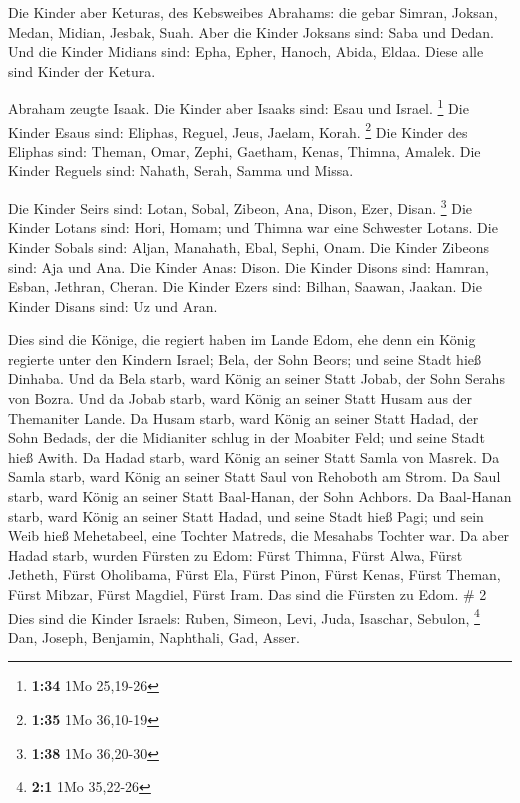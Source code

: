  Die Kinder aber Keturas, des Kebsweibes Abrahams: die
gebar Simran, Joksan, Medan, Midian, Jesbak, Suah. Aber die Kinder
Joksans sind: Saba und Dedan.  Und die Kinder Midians sind:
Epha, Epher, Hanoch, Abida, Eldaa. Diese alle sind Kinder der Ketura.

 Abraham zeugte Isaak. Die Kinder aber Isaaks sind: Esau
und Israel. \footnote{\textbf{1:34} 1Mo 25,19-26}  Die
Kinder Esaus sind: Eliphas, Reguel, Jeus, Jaelam, Korah. \footnote{\textbf{1:35}
  1Mo 36,10-19}  Die Kinder des Eliphas sind: Theman, Omar,
Zephi, Gaetham, Kenas, Thimna, Amalek.  Die Kinder Reguels
sind: Nahath, Serah, Samma und Missa.

 Die Kinder Seirs sind: Lotan, Sobal, Zibeon, Ana, Dison,
Ezer, Disan. \footnote{\textbf{1:38} 1Mo 36,20-30}  Die
Kinder Lotans sind: Hori, Homam; und Thimna war eine Schwester Lotans.
 Die Kinder Sobals sind: Aljan, Manahath, Ebal, Sephi,
Onam. Die Kinder Zibeons sind: Aja und Ana.  Die Kinder
Anas: Dison. Die Kinder Disons sind: Hamran, Esban, Jethran, Cheran.
 Die Kinder Ezers sind: Bilhan, Saawan, Jaakan. Die Kinder
Disans sind: Uz und Aran.

 Dies sind die Könige, die regiert haben im Lande Edom, ehe
denn ein König regierte unter den Kindern Israel; Bela, der Sohn Beors;
und seine Stadt hieß Dinhaba.  Und da Bela starb, ward
König an seiner Statt Jobab, der Sohn Serahs von Bozra. 
Und da Jobab starb, ward König an seiner Statt Husam aus der Themaniter
Lande.  Da Husam starb, ward König an seiner Statt Hadad,
der Sohn Bedads, der die Midianiter schlug in der Moabiter Feld; und
seine Stadt hieß Awith.  Da Hadad starb, ward König an
seiner Statt Samla von Masrek.  Da Samla starb, ward König
an seiner Statt Saul von Rehoboth am Strom.  Da Saul starb,
ward König an seiner Statt Baal-Hanan, der Sohn Achbors. 
Da Baal-Hanan starb, ward König an seiner Statt Hadad, und seine Stadt
hieß Pagi; und sein Weib hieß Mehetabeel, eine Tochter Matreds, die
Mesahabs Tochter war.  Da aber Hadad starb, wurden Fürsten
zu Edom: Fürst Thimna, Fürst Alwa, Fürst Jetheth,  Fürst
Oholibama, Fürst Ela, Fürst Pinon,  Fürst Kenas, Fürst
Theman, Fürst Mibzar,  Fürst Magdiel, Fürst Iram. Das sind
die Fürsten zu Edom. \# 2  Dies sind die Kinder Israels:
Ruben, Simeon, Levi, Juda, Isaschar, Sebulon, \footnote{\textbf{2:1} 1Mo
  35,22-26}  Dan, Joseph, Benjamin, Naphthali, Gad, Asser.

